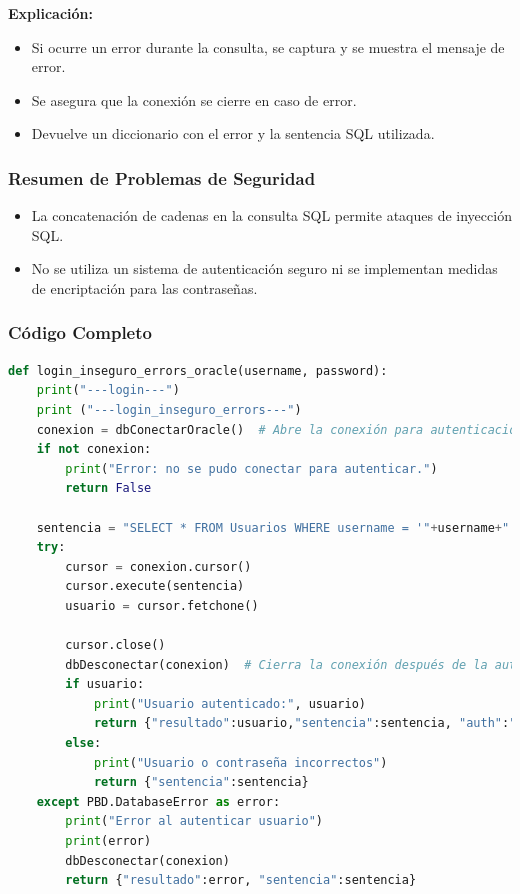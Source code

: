 \documentclass[a4paper,12pt]{article}
\begin{document}
\textbf{Explicación:}
\begin{itemize}
    \item Si ocurre un error durante la consulta, se captura y se muestra el mensaje de error.
    \item Se asegura que la conexión se cierre en caso de error.
    \item Devuelve un diccionario con el error y la sentencia SQL utilizada.
\end{itemize}

\subsubsection{Resumen de Problemas de Seguridad}
\begin{itemize}
    \item La concatenación de cadenas en la consulta SQL permite ataques de inyección SQL.
    \item No se utiliza un sistema de autenticación seguro ni se implementan medidas de encriptación para las contraseñas.
\end{itemize}

\subsubsection{Código Completo}
\begin{lstlisting}[language=Python]
def login_inseguro_errors_oracle(username, password):
    print("---login---")
    print ("---login_inseguro_errors---")
    conexion = dbConectarOracle()  # Abre la conexión para autenticación
    if not conexion:
        print("Error: no se pudo conectar para autenticar.")
        return False

    sentencia = "SELECT * FROM Usuarios WHERE username = '"+username+"' AND password = '"+password+"'"
    try:
        cursor = conexion.cursor()
        cursor.execute(sentencia)
        usuario = cursor.fetchone()

        cursor.close()
        dbDesconectar(conexion)  # Cierra la conexión después de la autenticación
        if usuario:
            print("Usuario autenticado:", usuario)
            return {"resultado":usuario,"sentencia":sentencia, "auth":"true"}
        else:
            print("Usuario o contraseña incorrectos")
            return {"sentencia":sentencia}
    except PBD.DatabaseError as error:
        print("Error al autenticar usuario")
        print(error)
        dbDesconectar(conexion)
        return {"resultado":error, "sentencia":sentencia}
\end{lstlisting}
\end{document}
